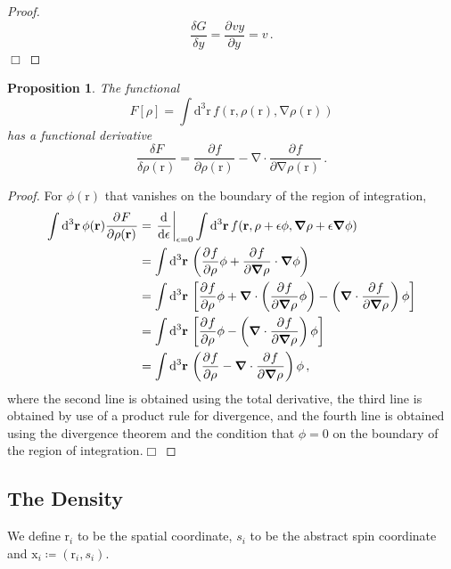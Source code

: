 \documentclass{article}
\theoremstyle{plain}\theoremheaderfont{\normalfont\itshape}\theorembodyfont{\rmfamily}\theoremseparator{.}\newtheorem*{rem}{Remark}\newtheorem*{ex}{Example}\newtheorem*{proof}{Proof}\newtheorem*{altp}{Alternative proof}
\theoremstyle{plain}\theoremheaderfont{\normalfont\bfseries}\theorembodyfont{\rmfamily}\theoremseparator{.}\newtheorem{thm}{Theorem}[section]\newtheorem{lem}[thm]{Lemma}\newtheorem{prop}[thm]{Proposition}\newtheorem*{cor}{Corollary}\newtheorem{defn}[thm]{Definition}\newtheorem{clm}[thm]{Claim}\newtheorem{clminproof}{Claim}
\theoremstyle{break}\theoremheaderfont{\normalfont\itshape}\theorembodyfont{\rmfamily}\theoremseparator{.\medskip}\newtheorem*{proofskip}{Proof}\newtheorem*{exs}{Examples}\newtheorem*{rems}{Remarks}
\theoremstyle{break}\theoremheaderfont{\normalfont\bfseries}\theorembodyfont{\rmfamily}\theoremseparator{.\medskip}\newtheorem{lemskip}[thm]{Lemma}\newtheorem{defnskip}[thm]{Definition}\newtheorem{propskip}[thm]{Proposition}\newtheorem{thmskip}[thm]{Theorem}
\numberwithin{equation}{section}
\newcommand{\qed}{\hfill\ensuremath{\Box}}
\newcommand{\dd}[2][]{\mathrm{d}^{#1} #2\,}
\newcommand{\dv}[3][]{\frac{\mathrm{d}^{#1} #2}{{\mathrm{d} #3}^{#1}}}
\newcommand{\pdv}[3][]{\frac{\partial^{#1} #2}{{\partial #3}^{#1}}}
\newcommand{\vb}[1]{\bm{\mathrm{#1}}}
\newcommand{\grad}{\vb{\nabla}}
\renewcommand{\div}{\vb{\nabla}\cdot}
\begin{document}
    \begin{proof}
        \begin{equation}
            \frac{\delta G}{\delta y}=\pdv{vy}{y}=v\,.
        \end{equation}\qed
    \end{proof}
    \begin{prop}
        The functional
        \begin{equation}
            F[\rho]=\int\dd[3]{\vb{r}}f(\vb{r},\rho(\vb{r}),\grad\rho(\vb{r}))
        \end{equation}
        has a functional derivative
        \begin{equation}
            \frac{\delta F}{\delta \rho(\vb{r})}=\pdv{f}{\rho(\vb{r})}-\div\pdv{f}{\grad\rho(\vb{r})}\,.
        \end{equation}
    \end{prop}
    \begin{proof}
        For \(\phi(\vb{r})\) that vanishes on the boundary of the region of integration,
        \begin{align}
            \int\dd[3]{\vb{r}}\phi(\vb{r})\pdv{F}{\rho(\vb{r})}&=\left.\dv{}{\epsilon}\right|_{\epsilon=0}\int\dd[3]{\vb{r}}f(\vb{r},\rho+\epsilon\phi,\grad\rho+\epsilon\grad\phi)\notag\\
            &=\int\dd[3]{\vb{r}}\left(\pdv{f}{\rho}\phi+\pdv{f}{\grad\rho}\cdot\grad\phi\right)\notag\\
            &=\int\dd[3]{\vb{r}}\left[\pdv{f}{\rho}\phi+\div\left(\pdv{f}{\grad\rho}\phi\right)-\left(\div\pdv{f}{\grad\rho}\right)\phi\right]\notag\\
            &=\int\dd[3]{\vb{r}}\left[\pdv{f}{\rho}\phi-\left(\div\pdv{f}{\grad\rho}\right)\phi\right]\notag\\
            &=\int\dd[3]{\vb{r}}\left(\pdv{f}{\rho}-\div\pdv{f}{\grad\rho}\right)\phi\,,
        \end{align}
        where the second line is obtained using the total derivative, the third line is obtained by use of a product rule for divergence, and the fourth line is obtained using the divergence theorem and the condition that \(\phi =0\) on the boundary of the region of integration.\qed
    \end{proof}
    \subsection{The Density}
    We define \(\vb{r}_i\) to be the spatial coordinate, \(s_i\) to be the abstract spin coordinate and \(\vb{x}_i\coloneqq(\vb{r}_i, s_i)\).
\end{document}
